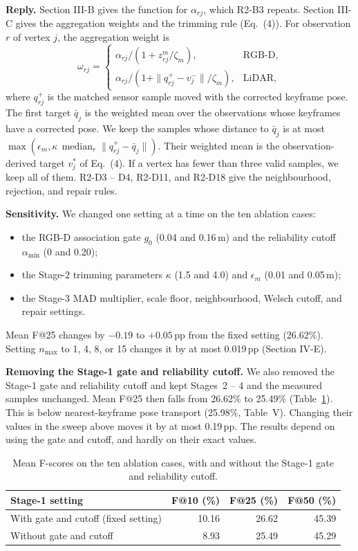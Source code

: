 \documentclass[11pt,a4paper]{article}
\newenvironment{reply}{\begingroup\color{replyblue}\textbf{Reply.} }{\par\endgroup}
\begin{document}
\begin{reply}
Section III-B gives the function for $\alpha_{rj}$, which R2-B3 repeats. Section III-C gives the aggregation weights and the trimming rule (Eq.~(4)). For observation $r$ of vertex $j$, the aggregation weight is
\[
\omega_{rj}=\begin{cases}
\alpha_{rj}/(1+z^m_{rj}/\zeta_m), & \text{RGB-D},\\
\alpha_{rj}/(1+\|q_{rj}^+-v_j^-\|/\zeta_m), & \text{LiDAR},
\end{cases}
\]
where $q_{rj}^+$ is the matched sensor sample moved with the corrected keyframe pose. The first target $\bar q_j$ is the weighted mean over the observations whose keyframes have a corrected pose. We keep the samples whose distance to $\bar q_j$ is at most $\max(\epsilon_m,\kappa\,\operatorname{median}_r\|q_{rj}^+-\bar q_j\|)$. Their weighted mean is the observation-derived target $v_j^*$ of Eq.~(4). If a vertex has fewer than three valid samples, we keep all of them. R2-D3 -- D4, R2-D11, and R2-D18 give the neighbourhood, rejection, and repair rules.

\textbf{Sensitivity.}
We changed one setting at a time on the ten ablation cases:
\begin{itemize}[leftmargin=*,topsep=2pt,itemsep=2pt]
\item the RGB-D association gate $g_0$ (0.04 and 0.16\,m) and the reliability cutoff $\alpha_{\min}$ (0 and 0.20);
\item the Stage-2 trimming parameters $\kappa$ (1.5 and 4.0) and $\epsilon_m$ (0.01 and 0.05\,m);
\item the Stage-3 MAD multiplier, scale floor, neighbourhood, Welsch cutoff, and repair settings.
\end{itemize}
Mean F@25 changes by $-0.19$ to $+0.05$\,pp from the fixed setting (26.62\%). Setting $n_{\max}$ to 1, 4, 8, or 15 changes it by at most 0.019\,pp (Section IV-E).

\textbf{Removing the Stage-1 gate and reliability cutoff.}
We also removed the Stage-1 gate and reliability cutoff and kept Stages~2 -- 4 and the measured samples unchanged. Mean F@25 then falls from 26.62\% to 25.49\% (Table~\ref{tab:reply-association-gates}). This is below nearest-keyframe pose transport (25.98\%, Table~V). Changing their values in the sweep above moves it by at most 0.19\,pp. The results depend on using the gate and cutoff, and hardly on their exact values.

\begin{table}[H]
\centering\small
\caption{Mean F-scores on the ten ablation cases, with and without the Stage-1 gate and reliability cutoff.}\label{tab:reply-association-gates}
\begin{tabular}{lrrr}
\toprule
Stage-1 setting & F@10 (\%) & F@25 (\%) & F@50 (\%)\\
\midrule
With gate and cutoff (fixed setting) & 10.16 & 26.62 & 45.39\\
Without gate and cutoff & 8.93 & 25.49 & 45.29\\
\bottomrule
\end{tabular}
\end{table}
\end{reply}
\end{document}
